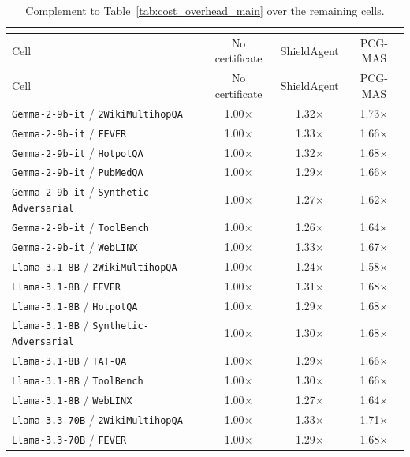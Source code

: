 \begin{longtable}{lccc}
\caption{\small Complement to Table~\ref{tab:cost_overhead_main} over the remaining cells.}\\
\label{tab:appendix_remaining_50_cost}\\
\toprule
Cell & No certificate & ShieldAgent & PCG-MAS \\
\midrule
\endfirsthead
\toprule
Cell & No certificate & ShieldAgent & PCG-MAS \\
\midrule
\endhead
\texttt{Gemma-2-9b-it} / \texttt{2WikiMultihopQA} & 1.00$\times$ & 1.32$\times$ & 1.73$\times$ \\
\texttt{Gemma-2-9b-it} / \texttt{FEVER} & 1.00$\times$ & 1.33$\times$ & 1.66$\times$ \\
\texttt{Gemma-2-9b-it} / \texttt{HotpotQA} & 1.00$\times$ & 1.32$\times$ & 1.68$\times$ \\
\texttt{Gemma-2-9b-it} / \texttt{PubMedQA} & 1.00$\times$ & 1.29$\times$ & 1.66$\times$ \\
\texttt{Gemma-2-9b-it} / \texttt{Synthetic-Adversarial} & 1.00$\times$ & 1.27$\times$ & 1.62$\times$ \\
\texttt{Gemma-2-9b-it} / \texttt{ToolBench} & 1.00$\times$ & 1.26$\times$ & 1.64$\times$ \\
\texttt{Gemma-2-9b-it} / \texttt{WebLINX} & 1.00$\times$ & 1.33$\times$ & 1.67$\times$ \\
\texttt{Llama-3.1-8B} / \texttt{2WikiMultihopQA} & 1.00$\times$ & 1.24$\times$ & 1.58$\times$ \\
\texttt{Llama-3.1-8B} / \texttt{FEVER} & 1.00$\times$ & 1.31$\times$ & 1.68$\times$ \\
\texttt{Llama-3.1-8B} / \texttt{HotpotQA} & 1.00$\times$ & 1.29$\times$ & 1.68$\times$ \\
\texttt{Llama-3.1-8B} / \texttt{Synthetic-Adversarial} & 1.00$\times$ & 1.30$\times$ & 1.68$\times$ \\
\texttt{Llama-3.1-8B} / \texttt{TAT-QA} & 1.00$\times$ & 1.29$\times$ & 1.66$\times$ \\
\texttt{Llama-3.1-8B} / \texttt{ToolBench} & 1.00$\times$ & 1.30$\times$ & 1.66$\times$ \\
\texttt{Llama-3.1-8B} / \texttt{WebLINX} & 1.00$\times$ & 1.27$\times$ & 1.64$\times$ \\
\texttt{Llama-3.3-70B} / \texttt{2WikiMultihopQA} & 1.00$\times$ & 1.33$\times$ & 1.71$\times$ \\
\texttt{Llama-3.3-70B} / \texttt{FEVER} & 1.00$\times$ & 1.29$\times$ & 1.68$\times$ \\

\end{longtable}
